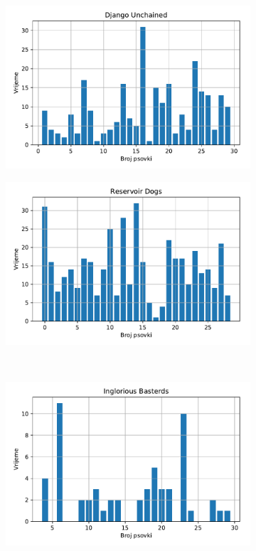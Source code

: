 \documentclass[11pt]{foi}
\begin{document}
\begin{figure}[h]
    \centering
    \begin{subfigure}[t]{0.5\textwidth}
        \centering
        \includegraphics{slike/django.pdf}
    \end{subfigure}%
    \begin{subfigure}[t]{0.5\textwidth}
        \centering
        \includegraphics{slike/dogs.pdf}
    \end{subfigure}\\
    \begin{subfigure}[t]{0.5\textwidth}
        \centering
        \includegraphics{slike/bastards.pdf}

\end{subfigure}
\end{figure}
\end{document}
